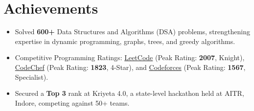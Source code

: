 \documentclass[8pt,letterpaper]{article}
\begin{document}
\section{Achievements}
\vspace{2.5pt}
\begin{itemize}[itemsep=2.5pt]
  \item Solved \textbf{600+} Data Structures and Algorithms (DSA) problems, strengthening expertise in dynamic programming, graphs, trees, and greedy algorithms.
  \item Competitive Programming Ratings: 
  \href{https://leetcode.com/u/ankitp_18/}{LeetCode} (Peak Rating: \textbf{2007}, Knight), 
  \href{https://www.codechef.com/users/ankitp_18}{CodeChef} (Peak Rating: \textbf{1823}, 4-Star), and 
  \href{https://codeforces.com/profile/Ankit_Prajapat}{Codeforces} (Peak Rating: \textbf{1567}, Specialist).
  \item Secured a \textbf{Top 3} rank at Kriyeta 4.0, a state-level hackathon held at AITR, Indore, competing against 50+ teams.
\end{itemize}
\end{document}
